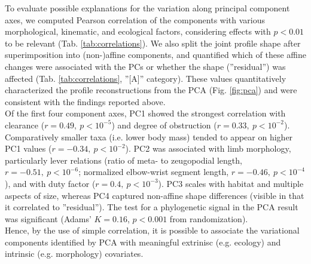 \documentclass[10pt, a4paper]{article}
\begin{document}
\begin{linenumbers}[1]
To evaluate possible explanations for the variation along principal component axes, we computed Pearson correlation of the components with various morphological, kinematic, and ecological factors, considering effects with $p<0.01$ to be relevant (Tab. \ref{tab:correlations}). 
We also split the joint profile shape after superimposition into (non-)affine components, and quantified which of these affine changes were associated with the PCs or whether the shape (''residual'') was affected (Tab. \ref{tab:correlations}, ''[A]'' category). 
These values quantitatively characterized the profile reconstructions from the PCA (Fig. \ref{fig:pca}) and were consistent with the findings reported above. 
\\Of the first four component axes, PC1 showed the strongest correlation with clearance ($r = 0.49,\ p < 10^{-5}$) and degree of obstruction ($r = 0.33,\ p < 10^{-2}$). 
Comparatively smaller taxa (i.e. lower body mass) tended to appear on higher PC1 values ($r = -0.34,\ p < 10^{-2}$). 
PC2 was associated with limb morphology, particularly lever relations (ratio of meta- to zeugopodial length, $r = -0.51,\ p < 10^{-6}$; normalized elbow-wrist segment length, $r = -0.46,\ p < 10^{-4}$), and with duty factor ($r = 0.4,\ p < 10^{-3}$). 
PC3 scales with habitat and multiple aspects of size, whereas PC4 captured non-affine shape differences (visible in that it correlated to ''residual''). 
The test for a phylogenetic signal in the PCA result was significant (Adams' $K=0.16$, $p < 0.001$ from randomization). 
\\Hence, by the use of simple correlation, it is possible to associate the variational components identified by PCA with meaningful extrinisc (e.g. ecology) and intrinsic (e.g. morphology) covariates. 
\end{linenumbers}




\FloatBarrier\pagebreak
\end{document}
